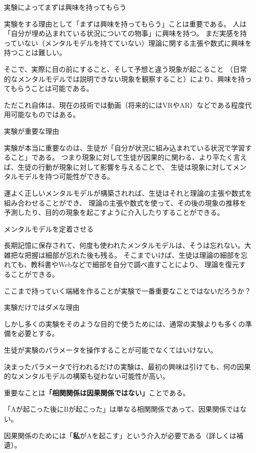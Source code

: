 \documentclass[12pt, unicode]{beamer}
\begin{document}
\begin{frame}{実験によってまずは興味を持ってもらう}

実験をする理由として「まずは興味を持ってもらう」ことは重要である。
人は「自分が埋め込まれている状況についての物事」に興味を持つ。
まだ実感を持っていない（メンタルモデルを持てていない）理論に関する主張や数式に興味を持つことは難しい。

そこで、実際に目の前にすること、そして予想と違う現象が起こること
（日常的なメンタルモデルでは説明できない現象を観察すること）により、興味を持ってもらうことは可能である。

ただこれ自体は、現在の技術では動画（将来的にはVRやAR）などである程度代用可能なものではある。

\end{frame}

\begin{frame}{実験が重要な理由}

実験が本当に重要なのは、生徒が「自分が状況に組み込まれている状況で学習すること」である。
つまり現象に対して生徒が因果的に関わる、より平たく言えば、生徒の行動が現象に対して影響を与えることで、
生徒は現象に対してメンタルモデルを持つ可能性ができる。

運よく正しいメンタルモデルが構築されれば、生徒はそれと理論の主張や数式を組み合わせることができ、
理論の主張や数式を使って、その後の現象の推移を予測したり、目的の現象を起こすように介入したりすることができる。

\end{frame}
\begin{frame}{メンタルモデルを定着させる}

長期記憶に保存されて、何度も使われたメンタルモデルは、そうは忘れない。大雑把な把握は細部が忘れた後も残る。
そこまでいけば、生徒は理論の細部を忘れても、教科書やWebなどで細部を自分で調べ直すことにより、
理論を復元することができる。

ここまで持っていく端緒を作ることが実験で一番重要なことではないだろうか？

\end{frame}

\begin{frame}{実験だけではダメな理由}

しかし多くの実験をそのような目的で使うためには、通常の実験よりも多くの準備を必要とする。

生徒が実験のパラメータを操作することが可能でなくてはいけない。

決まったパラメータで行われるだけの実験は、最初の興味は引けても、何の因果的なメンタルモデルの構築も従わない可能性が高い。

重要なことは\textbf{「相関関係は因果関係ではない」}ことである。

「Aが起こった後にBが起こった」は単なる相関関係であって、因果関係ではない。

因果関係のためには「\textbf{私}がAを起こす」という介入が必要である（詳しくは補遺）。

\end{frame}
\end{document}
